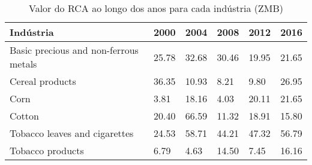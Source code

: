 \begin{table}
\centering
\caption{Valor do RCA ao longo dos anos para cada indústria (ZMB)}
\begin{tabular}{p{6cm}p{1.5cm}p{1.5cm}p{1.5cm}p{1.5cm}p{1.5cm}}
\toprule
                            Indústria &  2000 &  2004 &  2008 &  2012 &  2016 \\
\midrule
Basic precious and non-ferrous metals & 25.78 & 32.68 & 30.46 & 19.95 & 21.65 \\
                      Cereal products & 36.35 & 10.93 &  8.21 &  9.80 & 26.95 \\
                                 Corn &  3.81 & 18.16 &  4.03 & 20.11 & 21.65 \\
                               Cotton & 20.40 & 66.59 & 11.32 & 18.91 & 15.80 \\
        Tobacco leaves and cigarettes & 24.53 & 58.71 & 44.21 & 47.32 & 56.79 \\
                     Tobacco products &  6.79 &  4.63 & 14.50 &  7.45 & 16.16 \\
\bottomrule
\end{tabular}
\end{table}
